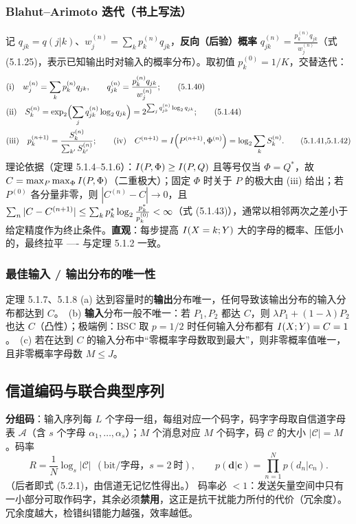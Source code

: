 \subsubsection{Blahut--Arimoto 迭代（书上写法）}

记 $q_{jk}=q(j|k)$、$w_j^{(n)}=\sum_kp_k^{(n)}q_{jk}$，\textbf{反向（后验）概率} $q_{jk}^{(n)}=\frac{p_k^{(n)}q_{jk}}{w_j^{(n)}}$（式 (5.1.25)，表示已知输出时对输入的概率分布）。取初值 $p_k^{(0)}=1/K$，交替迭代：
\begin{align}
&\text{(i)}\quad w_j^{(n)}=\sum_{k}p_k^{(n)}q_{jk},\qquad
q_{jk}^{(n)}=\frac{p_k^{(n)}q_{jk}}{w_j^{(n)}};\tag{5.1.40}\\
&\text{(ii)}\quad S_k^{(n)}=\exp_2\Bigl(\sum_{j}q_{jk}^{(n)}\log_{2} q_{jk}\Bigr)
=2^{\sum_j q_{jk}^{(n)}\log_{2} q_{jk}};\tag{5.1.44}\\
&\text{(iii)}\quad p_k^{(n+1)}=\frac{S_k^{(n)}}{\sum_{k'}S_{k'}^{(n)}};\qquad
\text{(iv)}\quad C^{(n+1)}=I\!\left(P^{(n+1)},\Phi^{(n)}\right)=\log_{2}\sum_kS_k^{(n)}.\tag{5.1.41,5.1.42}
\end{align}
理论依据（定理 5.1.4--5.1.6）：$I\!\left(P,\Phi\right)\ge I\!\left(P,Q\right)$ 且等号仅当 $\Phi=Q^*$，故 $C=\max_P\max_\Phi I\!\left(P,\Phi\right)$（二重极大）；固定 $\Phi$ 时关于 $P$ 的极大由 (iii) 给出；若 $P^{(0)}$ 各分量非零，则 $|C^{(n)}-C|\to0$，且 $\sum_n|C-C^{(n+1)}|\le\sum_kp_k^*\log_{2}\frac{p_k^*}{p_k^{(0)}}<\infty$（式 (5.1.43)），通常以相邻两次之差小于给定精度作为终止条件。\textbf{直观}：每步提高 $I\!\left(X=k;Y\right)$ 大的字母的概率、压低小的，最终拉平 ---- 与定理 5.1.2 一致。

\subsubsection{最佳输入 / 输出分布的唯一性}

\begin{thmbox}{定理 5.1.7、5.1.8}
(a) 达到容量时的\textbf{输出}分布唯一，任何导致该输出分布的输入分布都达到 $C$。\ (b) \textbf{输入}分布一般不唯一：若 $P_1,P_2$ 都达 $C$，则 $\lambda P_1+(1-\lambda)P_2$ 也达 $C$（凸性）；极端例：BSC 取 $p=1/2$ 时任何输入分布都有 $I\!\left(X;Y\right)=C=1$。\ (c) 若在达到 $C$ 的输入分布中“零概率字母数取到最大”，则非零概率值唯一，且非零概率字母数 $M\le J$。
\end{thmbox}

\subsection{信道编码与联合典型序列}

\textbf{分组码}：输入序列每 $L$ 个字母一组，每组对应一个码字，码字字母取自信道字母表 $\mathcal{A}$（含 $s$ 个字母 $\alpha_1,\dots,\alpha_s$）；$M$ 个消息对应 $M$ 个码字，码 $\mathcal{C}$ 的大小 $|\mathcal{C}|=M$。码率
\begin{equation*}
R=\frac1N\log_s|\mathcal{C}|\ \ (\text{bit/字母，}s=2\ \text{时}),\qquad
p(\mathbf{d}|\mathbf{c})=\prod_{n=1}^{N}p(d_n|c_n).
\end{equation*}
（后者即式 (5.2.1)，由信道无记忆性得出。）
码率必 $<1$：发送矢量空间中只有一小部分可取作码字，其余必须\textbf{禁用}，这正是抗干扰能力所付的代价（冗余度）。冗余度越大，检错纠错能力越强，效率越低。

